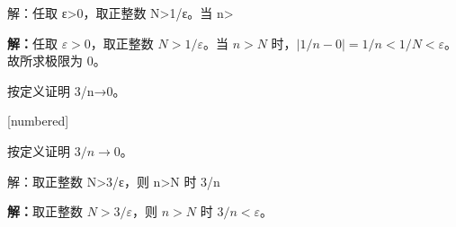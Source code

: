 \documentclass[aspectratio=169,10pt,fontset=fandol]{ctexbeamer}
\makeatletter
\newcommand{\mathagentexerciselabelcontext}[1]{%
\hypertarget<1>{#1}{}%
\edef\@currentHref{#1}%
}
\makeatother
\begin{document}
\begin{frame}[t,fragile]{解：任取 ε>0，取正整数 N>1/ε。当 n>}
\normalsize
{\normalsize
\par\noindent\textbf{解：}任取 $\varepsilon>0$，取正整数 $N>1/\varepsilon$。当 $n>N$ 时，$|1/n-0|=1/n<1/N<\varepsilon$。故所求极限为 $0$。\par

}
\end{frame}
\begin{frame}[t,fragile]{按定义证明 3/n→0。}
\normalsize
{\normalsize
[numbered]
\mathagentexerciselabelcontext{mathagent.exercise.U0008.0}
\begin{exercise}
\label{mathagent:exercise:0cc0e7ee849eb730aacd59475ce492febad40593b04fd779ce32c70f94e1140f}
按定义证明 $3/n\to0$。
\end{exercise}
}
\end{frame}
\begin{frame}[t,fragile]{解：取正整数 N>3/ε，则 n>N 时 3/n}
\normalsize
{\normalsize
\par\noindent\textbf{解：}取正整数 $N>3/\varepsilon$，则 $n>N$ 时 $3/n<\varepsilon$。\par

}
\end{frame}
\end{document}
